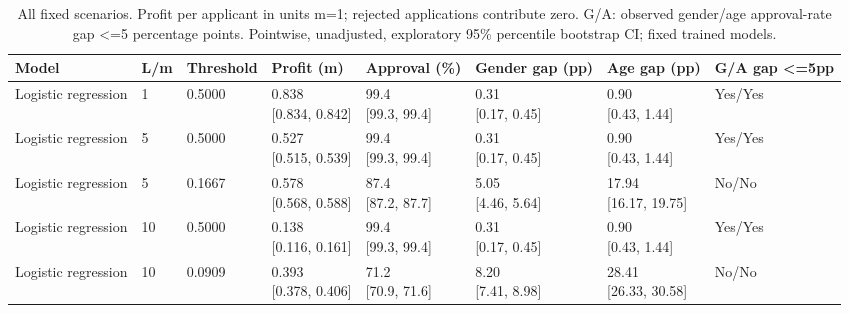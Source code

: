 \begingroup
\scriptsize
\setlength{\tabcolsep}{3pt}
\begin{longtable}{llllllll}
\caption{All fixed scenarios. Profit per applicant in units m=1; rejected applications contribute zero. G/A: observed gender/age approval-rate gap <=5 percentage points. Pointwise, unadjusted, exploratory 95\% percentile bootstrap CI; fixed trained models.}\label{tab:profit-fairness-all}\\
\toprule
Model & L/m & Threshold & Profit (m) & Approval (\%) & Gender gap (pp) & Age gap (pp) & G/A gap <=5pp \\
\midrule
Logistic regression & 1 & 0.5000 & \shortstack{{0.838} \\ {[0.834, 0.842]}} & \shortstack{{99.4} \\ {[99.3, 99.4]}} & \shortstack{{0.31} \\ {[0.17, 0.45]}} & \shortstack{{0.90} \\ {[0.43, 1.44]}} & Yes/Yes \\
Logistic regression & 5 & 0.5000 & \shortstack{{0.527} \\ {[0.515, 0.539]}} & \shortstack{{99.4} \\ {[99.3, 99.4]}} & \shortstack{{0.31} \\ {[0.17, 0.45]}} & \shortstack{{0.90} \\ {[0.43, 1.44]}} & Yes/Yes \\
Logistic regression & 5 & 0.1667 & \shortstack{{0.578} \\ {[0.568, 0.588]}} & \shortstack{{87.4} \\ {[87.2, 87.7]}} & \shortstack{{5.05} \\ {[4.46, 5.64]}} & \shortstack{{17.94} \\ {[16.17, 19.75]}} & No/No \\
Logistic regression & 10 & 0.5000 & \shortstack{{0.138} \\ {[0.116, 0.161]}} & \shortstack{{99.4} \\ {[99.3, 99.4]}} & \shortstack{{0.31} \\ {[0.17, 0.45]}} & \shortstack{{0.90} \\ {[0.43, 1.44]}} & Yes/Yes \\
Logistic regression & 10 & 0.0909 & \shortstack{{0.393} \\ {[0.378, 0.406]}} & \shortstack{{71.2} \\ {[70.9, 71.6]}} & \shortstack{{8.20} \\ {[7.41, 8.98]}} & \shortstack{{28.41} \\ {[26.33, 30.58]}} & No/No \\

\end{longtable}
